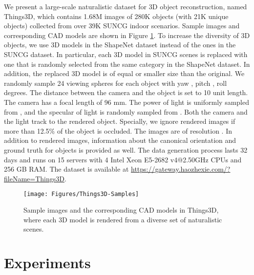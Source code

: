 \documentclass[twocolumn]{svjour3}
\begin{document}
We present a large-scale naturalistic dataset for 3D object reconstruction, named Things3D, which contains 1.68M images of 280K objects (with 21K unique objects) collected from over 39K SUNCG \citep{DBLP:conf/cvpr/SongYZCSF17} indoor scenarios.
Sample images and corresponding CAD models are shown in Figure \ref{fig:Things3D-samples}.
To increase the diversity of 3D objects, we use 3D models in the ShapeNet dataset instead of the ones in the SUNCG dataset.
In particular, each 3D model in SUNCG scenes is replaced with one that is randomly selected from the same category in the ShapeNet dataset.
In addition, the replaced 3D model is of equal or smaller size than the original.
We randomly sample 24 viewing spheres for each object with yaw , pitch , roll  degrees.
The distance between the camera and the object is set to 10 unit length.
The camera has a focal length of 96 mm.
The power of light is uniformly sampled from , and the specular of light is randomly sampled from .
Both the camera and the light track to the rendered object.
Specially, we ignore rendered images if more than 12.5\% of the object is occluded.
The images are of resolution .
In addition to rendered images, information about the canonical orientation and ground truth for objects is provided as well.
The data generation process lasts 32 days and runs on 15 servers with 4 Intel Xeon E5-2682 v4@2.50GHz CPUs and 256 GB RAM.
The dataset is available at \url{https://gateway.haozhexie.com/?fileName=Things3D}.

\begin{figure}[!t]
  \centering
  \resizebox{\linewidth}{!} {
    \texttt{[image: Figures/Things3D-Samples]}
  }
  \caption{Sample images and the corresponding CAD models in Things3D, where each 3D model is rendered from a diverse set of naturalistic scenes.}
  \label{fig:Things3D-samples}
\end{figure}

\section{Experiments}
\end{document}
